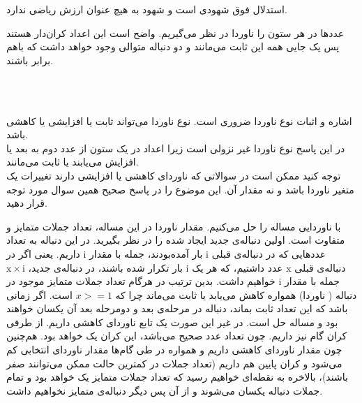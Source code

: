\documentclass[11pt,largemargins]{h2wp}
\begin{document}
   
    \notes
    استدلال فوق شهودی است و شهود به هیچ عنوان ارزش ریاضی ندارد.
    
    
    \solution
    
    
    عدد‌ها در هر ستون را ناوردا در نظر می‌گیریم. واضح است این اعداد کران‌دار هستند پس یک جایی همه این ثابت می‌مانند و دو دنباله متوالی وجود خواهد داشت که باهم برابر باشند.
    
  
  
    
    \notes
    \\%
    \\%
    
    
    اشاره و اثبات نوع ناوردا ضروری است. نوع ناوردا می‌تواند ثابت یا افزایشی یا کاهشی باشد.
\\ 
     در این پاسخ نوع ناوردا غیر نزولی است زیرا اعداد در یک ستون از عدد دوم به بعد یا افزایش می‌یابند یا ثابت می‌مانند.
 \\   
     توجه کنید ممکن است در سوالاتی که ناوردای کاهشی یا افزایشی دارند تغییرات یک متغیر ناوردا باشد و نه مقدار آن. این موضوع را در پاسخ صحیح همین سوال مورد توجه قرار دهید.
    
    
   
   
   
   با ناوردایی مساله را حل می‌کنیم. مقدار ناوردا در این مساله، تعداد جملات متمایز و متفاوت است. اولین دنباله‌ی جدید ایجاد شده را در نظر بگیرید.
    در این دنباله به تعداد عددهایی که در دنباله‌ی قبلی
    $\mathrm{i}$
    بار آمده‌بودند، جمله با مقدار
    $\mathrm{i}$
    داریم. یعنی اگر در دنباله‌ی قبلی
    $\mathrm{x}$
    عدد داشتیم، که هر یک
    $\mathrm{i}$
    بار تکرار شده باشند، در دنباله‌ی جدید،
    $\mathrm{x \times i}$
    جمله با مقدار
    $\mathrm{i}$
    خواهیم داشت. بدین ترتیب در هرگام تعداد جملات متمایز موجود در دنباله  ( ناوردا) همواره کاهش می‌یابد یا ثابت می‌ماند چرا که 
    $ x>=1 $
    است.
     اگر زمانی باشد که این تعداد ثابت بماند، دنباله در مرحله‌ی بعد و دومرحله‌ بعد آن یکسان خواهند بود و مساله حل است. در غیر این صورت یک تابع ناوردای کاهشی داریم.
    از طرفی کران گام نیز داریم. چون تعداد عدد صحیح می‌باشد، این کران یک خواهد بود. هم‌چنین چون مقدار ناوردای کاهشی داریم و همواره در طی گام‌ها
    مقدار ناوردای انتخابی کم می‌شود و کران پایین هم داریم (تعداد جملات در کمترین حالت ممکن می‌توانند صفر باشند)، بالاخره به نقطه‌ای خواهیم رسید
    که تعداد جملات متمایز یک خواهد بود و تمام جملات دنباله یکسان می‌شوند و از آن پس دیگر دنباله‌ی متمایز نخواهیم داشت. 
    
    
\question
\end{document}
